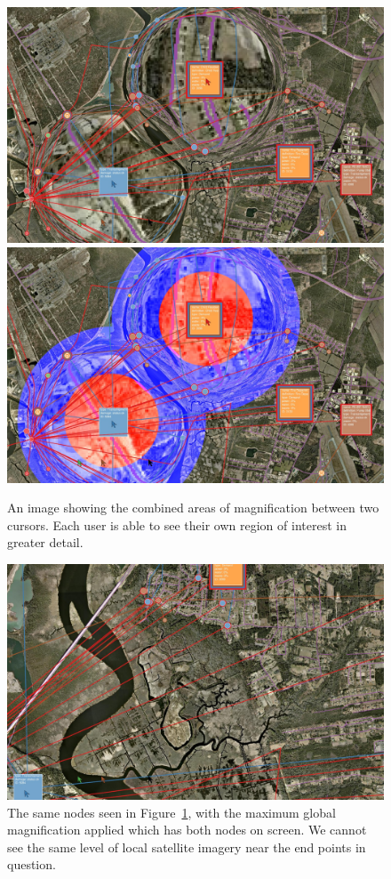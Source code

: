 \begin{figure}[htp]\centering
    \includegraphics[width=0.49\linewidth]{img/problem_solving_20_20.jpg}
    \includegraphics[width=0.49\linewidth]{img/problem_solving_20_20_color.jpg}
    \caption[Full Application with Two Areas of 6.7x Colored Linear Magnification]{An image showing the combined areas of magnification between two cursors. Each user is able to see their own region of interest in greater detail.}
    \label{fig:problem_solving}
\end{figure}

\begin{figure}[htp]\centering
    \includegraphics[width=0.90\linewidth]{img/normal_zoom.jpg}
    \caption[Full Application with Global Magnification]{The same nodes seen in Figure~\ref{fig:problem_solving}, with the maximum global magnification applied which has both nodes on screen. We cannot see the same level of local satellite imagery near the end points in question. }
    \label{fig:old_problem_solving}
\end{figure}

